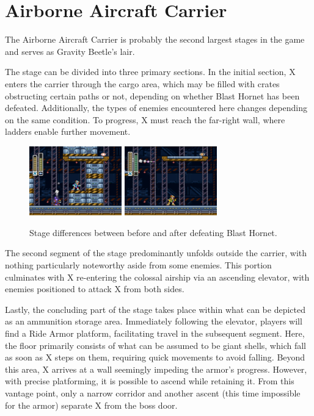 \section{Airborne Aircraft Carrier}
The Airborne Aircraft Carrier is probably the second largest stages in the game and serves as Gravity Beetle's lair.

The stage can be divided into three primary sections. In the initial section, X enters the carrier through the cargo area, which may be filled with crates obstructing certain paths or not, depending on whether Blast Hornet has been defeated. Additionally, the types of enemies encountered here changes depending on the same condition. To progress, X must reach the far-right wall, where ladders enable further movement.

\begin{figure}[htp]
	\centering
	\includegraphics[height=3cm]{figures/X3/Gravity_beetle/Stage_2.jpg}
	\includegraphics[height=3cm]{figures/X3/Gravity_beetle/Stage_1.jpg}
	\caption{Stage differences between before and after defeating Blast Hornet.}
\end{figure}

The second segment of the stage predominantly unfolds outside the carrier, with nothing particularly noteworthy aside from some enemies. This portion culminates with X re-entering the colossal airship via an ascending elevator, with enemies positioned to attack X from both sides.

Lastly, the concluding part of the stage takes place within what can be depicted as an ammunition storage area. Immediately following the elevator, players will find a Ride Armor platform, facilitating travel in the subsequent segment. Here, the floor primarily consists of what can be assumed to be giant shells, which fall as soon as X steps on them, requiring quick movements to avoid falling. Beyond this area, X arrives at a wall seemingly impeding the armor's progress. However, with precise platforming, it is possible to ascend while retaining it. From this vantage point, only a narrow corridor and another ascent (this time impossible for the armor) separate X from the boss door.

